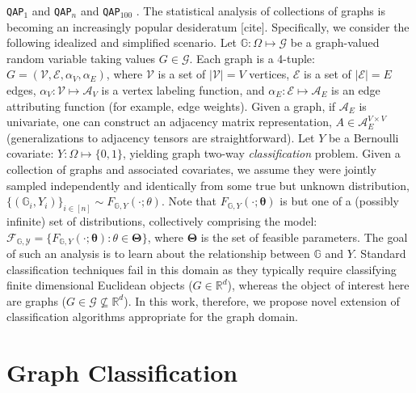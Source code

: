\documentclass{article} %
\providecommand{\ve}[1]{\boldsymbol{#1}}
\newcommand{\bth}{\ve{\theta}}
\newcommand{\bTh}{\ve{\Theta}}
\providecommand{\mc}[1]{\mathcal{#1}}
\newcommand{\Real}{\mathbb{R}}
\newcommand{\GG}{\mathbb{G}}
\newcommand{\qapa}{\texttt{QAP$_1$} }
\newcommand{\qapn}{\texttt{QAP$_n$} }
\newcommand{\qapb}{\texttt{QAP$_{100}$} }
\begin{document}
\qapa and \qapn and \qapb.
The statistical analysis of collections of graphs is becoming an increasingly popular desideratum [cite].  Specifically, we consider the following idealized and simplified scenario. Let $\GG: \Omega \mapsto \mc{G}$ be a graph-valued random variable taking values $G\in \mc{G}$. Each graph is a 4-tuple: $G=(\mc{V},\mc{E},\alpha_V,\alpha_E)$, where $\mc{V}$ is a set of $|\mc{V}|=V$ vertices, $\mc{E}$ is a set of $|\mc{E}|=E$ edges, $\alpha_V: \mc{V} \mapsto \mc{A}_V$ is a vertex labeling function, and $\alpha_E: \mc{E} \mapsto \mc{A}_E$ is an edge attributing function (for example, edge weights).  Given a graph, if $\mc{A}_E$ is univariate, one can construct an adjacency matrix representation, $A \in \mc{A}_E^{V \times V}$ (generalizations to adjacency tensors are straightforward).  Let $Y$ be a Bernoulli covariate: $Y: \Omega \mapsto \{0,1\}$, yielding graph two-way \emph{classification} problem.  Given a collection of graphs and associated covariates,  we assume they were jointly sampled independently and identically from some true but unknown distribution, $\{(\GG_i,Y_i)\}_{i \in [n]} \sim F_{\GG,Y}(\cdot; \theta)$.  Note that $F_{\GG,Y}(\cdot; \bth)$ is but one of a (possibly infinite) set of distributions, collectively comprising the model: $\mc{F_{\GG,Y}}=\{F_{\GG,Y}(\cdot; \bth) : \theta \in \bTh\}$, where $\bTh$ is the set of feasible parameters.  The goal of such an analysis is to learn about the relationship between $\GG$ and $Y$.   Standard classification techniques fail in this domain as they typically require classifying finite dimensional Euclidean objects ($G \in \Real^d$), whereas the object of interest here are graphs ($G \in \mc{G} \nsubseteq \Real^d$).   In this work, therefore, we propose novel extension of classification algorithms appropriate for the graph domain.



\section{Graph Classification} %
\label{sec:graph_classification}
\end{document}
